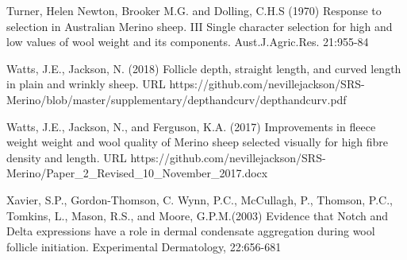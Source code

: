 \documentclass[titlepage]{article}  %
\begin{document}
\begin{thebibliography}{99}
Turner, Helen Newton, Brooker M.G. and Dolling, C.H.S (1970) Response to selection in Australian Merino sheep. III Single character selection for high and low values of wool weight and its components. Aust.J.Agric.Res. 21:955-84

Watts, J.E., Jackson, N. (2018) Follicle depth, straight length, and curved length in plain and wrinkly sheep. URL https://github.com/nevillejackson/SRS-Merino/blob/master/supplementary/depthandcurv/depthandcurv.pdf

Watts, J.E., Jackson, N., and Ferguson, K.A. (2017) Improvements in fleece weight weight and wool quality of Merino sheep selected visually for high fibre density and length. URL https://github.com/nevillejackson/SRS-Merino/Paper\_2\_Revised\_10\_November\_2017.docx 

Xavier, S.P., Gordon-Thomson, C. Wynn, P.C., McCullagh, P., Thomson, P.C., Tomkins, L., Mason, R.S., and Moore, G.P.M.(2003) Evidence that Notch and Delta expressions have a role in dermal condensate aggregation during wool follicle initiation. Experimental Dermatology, 22:656-681

\end{thebibliography}
\end{document}
